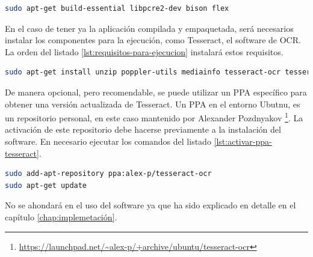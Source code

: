 \begin{lstlisting}[language=bash,caption={Dependencias para la compilación},label=lst:requisitos-para-compilacion]
sudo apt-get build-essential libpcre2-dev bison flex
\end{lstlisting}

En el caso de tener ya la aplicación compilada y empaquetada, será necesarios instalar los componentes para la ejecución, como Tesseract, el software de OCR. La orden del listado \ref{lst:requisitos-para-ejecucion} instalará estos requisitos.

\begin{lstlisting}[language=bash,caption={Dependencias para la ejecución},label=lst:requisitos-para-ejecucion]
sudo apt-get install unzip poppler-utils mediainfo tesseract-ocr tesseract-ocr-spa jq python3-opencv jq bc
\end{lstlisting}

De manera opcional, pero recomendable, se puede utilizar un PPA específico para obtener una versión actualizada de Tesseract. Un PPA en el entorno Ubutnu, es un repositorio personal, en este caso mantenido por Alexander Pozdnyakov \footnote{\url{https://launchpad.net/~alex-p/+archive/ubuntu/tesseract-ocr}}. La activación de este repositorio debe hacerse previamente a la instalación del software. En necesario ejecutar los comandos del listado \ref{lst:activar-ppa-tesseract}.

\begin{lstlisting}[language=bash,caption={Activar PPA},label=lst:activar-ppa-tesseract]
sudo add-apt-repository ppa:alex-p/tesseract-ocr
sudo apt-get update
\end{lstlisting}

No se ahondará en el uso del software ya que ha sido explicado en detalle en el capítulo \ref{chap:implemetación}.
